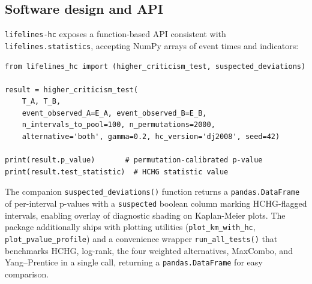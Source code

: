 \documentclass[11pt]{article}
\begin{document}
\subsection*{Software design and API}

\texttt{lifelines-hc} exposes a function-based API consistent with
\texttt{lifelines.statistics}, accepting NumPy arrays of event times and
indicators:

\begin{lstlisting}
from lifelines_hc import (higher_criticism_test, suspected_deviations)

result = higher_criticism_test(
    T_A, T_B,
    event_observed_A=E_A, event_observed_B=E_B,
    n_intervals_to_pool=100, n_permutations=2000,
    alternative='both', gamma=0.2, hc_version='dj2008', seed=42)

print(result.p_value)       # permutation-calibrated p-value
print(result.test_statistic)  # HCHG statistic value
\end{lstlisting}

\noindent
The companion \texttt{suspected\_deviations()} function returns a
\texttt{pandas.DataFrame} of per-interval p-values with a
\texttt{suspected} boolean column marking HCHG-flagged intervals,
enabling overlay of diagnostic shading on Kaplan-Meier plots. 
The package additionally ships with plotting utilities
(\texttt{plot\_km\_with\_hc}, \texttt{plot\_pvalue\_profile}) and a
convenience wrapper \texttt{run\_all\_tests()} that benchmarks HCHG, log-rank, the four weighted alternatives, MaxCombo, and Yang--Prentice in a single
call, returning a \texttt{pandas.DataFrame} for easy comparison.
\end{document}
